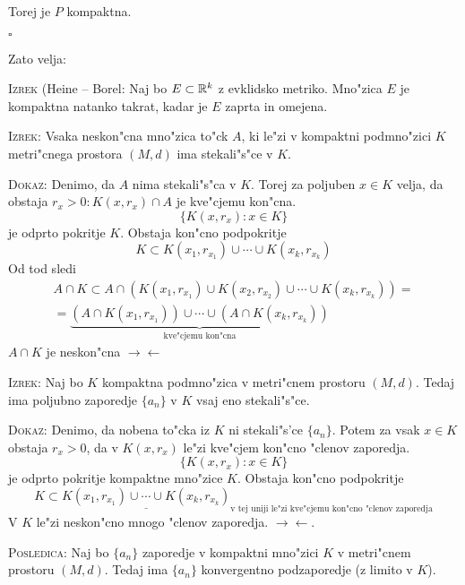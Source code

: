 Torej je $P$ kompaktna.

\hfill $\square$

Zato velja:

\textsc{Izrek} (Heine -- Borel: Naj bo $E \subset \mathbb{R}^k$ z evklidsko metriko. Mno"zica $E$ je kompaktna natanko takrat, kadar je $E$ zaprta in omejena.

\textsc{Izrek:} Vsaka neskon"cna mno"zica to"ck $A$, ki le"zi v kompaktni podmno"zici $K$ metri"cnega prostora $(M, d)$ ima stekali"s"ce v $K$.

\textsc{Dokaz:} Denimo, da $A$ nima stekali"s"ca v $K$. Torej za poljuben $x \in K$ velja, da obstaja $r_x > 0: K(x, r_x) \cap A$ je kve"cjemu kon"cna.
\begin{equation*}
\{ K(x, r_x): x \in K \}
\end{equation*}
je odprto pokritje $K$. Obstaja kon"cno podpokritje
\begin{equation*}
K \subset K(x_1, r_{x_1}) \cup \cdots \cup K(x_k, r_{x_k})
\end{equation*}
Od tod sledi
\begin{multline*}
A \cap K \subset A \cap (K(x_1, r_{x_1}) \cup K(x_2, r_{x_2}) \cup \cdots \cup K(x_k, r_{x_k})) = \\
= \underbrace{(A \cap K(x_1, r_{x_1})) \cup \cdots \cup (A \cap K(x_k, r_{x_k}))}_\text{kve"cjemu kon"cna}
\end{multline*}
$A \cap K$ je neskon"cna $\rightarrow \leftarrow$

\textsc{Izrek:} Naj bo $K$ kompaktna podmno"zica v metri"cnem prostoru $(M, d)$. Tedaj ima poljubno zaporedje $\{ a_n \}$ v $K$ vsaj eno stekali"s"ce.

\textsc{Dokaz:} Denimo, da nobena to"cka iz $K$ ni stekali"s'ce $\{ a_n \}$. Potem za vsak $x \in K$ obstaja $r_x > 0$, da v $K(x, r_x)$ le"zi kve"cjem kon"cno "clenov zaporedja.
\begin{equation*}
\{ K(x, r_x): x \in K \}
\end{equation*}
je odprto pokritje kompaktne mno"zice $K$. Obstaja kon"cno podpokritje
\begin{equation*}
K \subset \underline{K(x_1, r_{x_1}) \cup \cdots \cup K(x_k, r_{x_k})}_\text{v tej uniji le"zi kve"cjemu kon"cno "clenov zaporedja}
\end{equation*}
V $K$ le"zi neskon"cno mnogo "clenov zaporedja. $\rightarrow \leftarrow$.

\textsc{Posledica:} Naj bo $\{ a_n \}$ zaporedje v kompaktni mno"zici $K$ v metri"cnem prostoru $(M, d)$. Tedaj ima $\{ a_n \}$ konvergentno podzaporedje (z limito v $K$).

